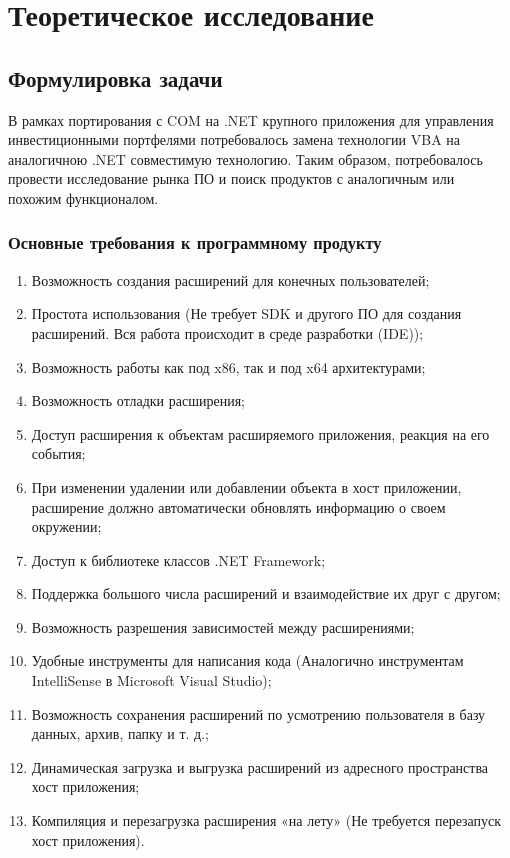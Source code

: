 \section{Теоретическое исследование}




\subsection{Формулировка задачи}

В рамках портирования с COM на .NET крупного приложения для управления инвестиционными портфелями потребовалось замена технологии VBA на аналогичною .NET совместимую технологию. Таким образом, потребовалось провести исследование рынка ПО и поиск продуктов с аналогичным или похожим функционалом.

\subsubsection{Основные требования к программному продукту}

\begin{enumerate}
\item Возможность создания расширений для конечных пользователей;
\item Простота использования (Не требует SDK и другого ПО для создания расширений. Вся работа происходит в среде разработки (IDE));
\item Возможность работы как под x86, так и под x64 архитектурами;
\item Возможность отладки расширения;
\item Доступ расширения к объектам расширяемого приложения, реакция на его события;
\item При изменении удалении или добавлении объекта в хост приложении, расширение должно автоматически обновлять информацию о своем окружении;
\item Доступ к библиотеке классов .NET Framework;
\item Поддержка большого числа расширений и взаимодействие их друг с другом;
\item Возможность разрешения зависимостей между расширениями;
\item Удобные инструменты для написания кода (Аналогично инструментам IntelliSense в Microsoft Visual Studio);
\item Возможность сохранения расширений по усмотрению пользователя в базу данных, архив, папку и т. д.;
\item Динамическая загрузка и выгрузка расширений из адресного пространства хост приложения;
\item Компиляция и перезагрузка расширения «на лету» (Не требуется перезапуск хост приложения).
\end{enumerate}

